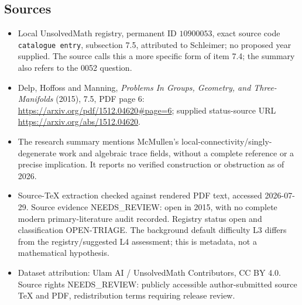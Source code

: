 \documentclass[11pt]{article}
\begin{document}
\subsection{Sources}
\begin{itemize}
\item Local UnsolvedMath registry, permanent ID \(10900053\), exact source code \texttt{catalogue entry}, subsection 7.5, attributed to Schleimer; no proposed year supplied. The source calls this a more specific form of item 7.4; the summary also refers to the 0052 question.
\item Delp, Hoffoss and Manning, \emph{Problems In Groups, Geometry, and Three-Manifolds} (2015), 7.5, PDF page 6: \url{https://arxiv.org/pdf/1512.04620#page=6}; supplied status-source URL \url{https://arxiv.org/abs/1512.04620}.
\item The research summary mentions McMullen's local-connectivity/singly-degenerate work and algebraic trace fields, without a complete reference or a precise implication. It reports no verified construction or obstruction as of 2026.
\item Source-TeX extraction checked against rendered PDF text, accessed 2026-07-29. Source evidence NEEDS\_REVIEW: open in 2015, with no complete modern primary-literature audit recorded. Registry status open and classification OPEN-TRIAGE. The background default difficulty L3 differs from the registry/suggested L4 assessment; this is metadata, not a mathematical hypothesis.
\item Dataset attribution: Ulam AI / UnsolvedMath Contributors, CC BY 4.0. Source rights NEEDS\_REVIEW: publicly accessible author-submitted source TeX and PDF, redistribution terms requiring release review.
\end{itemize}
\end{document}
